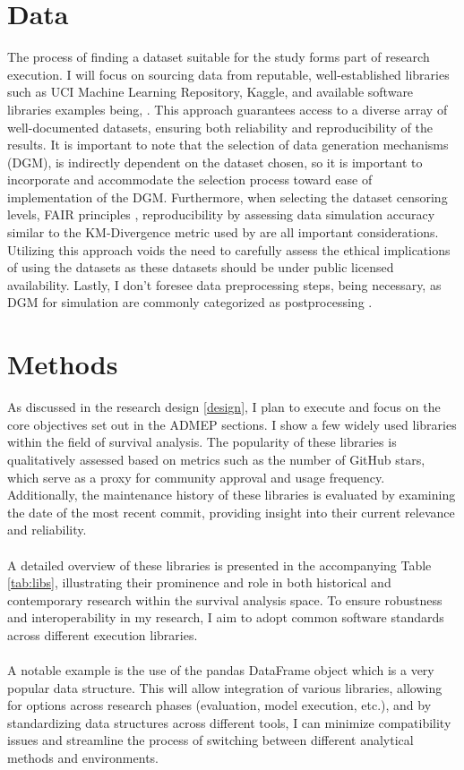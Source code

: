 \section{Data}
\noindent The process of finding a dataset suitable for the study forms part of research execution. I will focus on sourcing data from reputable, well-established libraries such as UCI Machine Learning Repository, Kaggle, and available software libraries examples being, \parencite{nagpal_auton-survival_2022} \parencite{davidson-pilon_lifelines_2024} \parencite{sebastian_polsterl_scikit-survival_2023}. This approach guarantees access to a diverse array of well-documented datasets, ensuring both reliability and reproducibility of the results. It is important to note that the selection of data generation mechanisms (DGM), is indirectly dependent on the dataset chosen, so it is important to incorporate and accommodate the selection process toward ease of implementation of the DGM. Furthermore, when selecting the dataset censoring levels, FAIR principles \parencite{wilkinson_fair_2016}, reproducibility by assessing data simulation accuracy similar to the KM-Divergence metric used by \parencite{norcliffe_survivalgan_2023} are all important considerations. Utilizing this approach voids the need to carefully assess the ethical implications of using the datasets as these datasets should be under public licensed availability. Lastly, I don't foresee data preprocessing steps, being necessary, as DGM for simulation are commonly categorized as postprocessing \parencite{jin_imputation_2024}. 

\section{Methods} \label{methods}
As discussed in the research design \ref{design}, I plan to execute and focus on the core objectives set out in the ADMEP sections. I show a few widely used libraries within the field of survival analysis. The popularity of these libraries is qualitatively assessed based on metrics such as the number of GitHub stars, which serve as a proxy for community approval and usage frequency. Additionally, the maintenance history of these libraries is evaluated by examining the date of the most recent commit, providing insight into their current relevance and reliability. 
\\\\
\noindent A detailed overview of these libraries is presented in the accompanying Table \ref{tab:libs}, illustrating their prominence and role in both historical and contemporary research within the survival analysis space. To ensure robustness and interoperability in my research, I aim to adopt common software standards across different execution libraries. 
\\\\
\noindent A notable example is the use of the pandas DataFrame object which is a very popular data structure. This will allow integration of various libraries, allowing for options across research phases (evaluation, model execution, etc.), and by standardizing data structures across different tools, I can minimize compatibility issues and streamline the process of switching between different analytical methods and environments.

